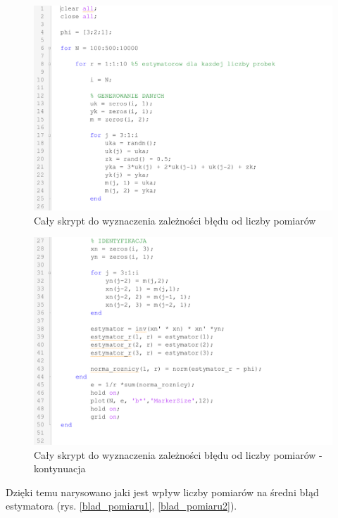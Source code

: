\documentclass[12pt]{article}
\begin{document}
\begin{figure}[H]
    \centering
    \includegraphics[width = \textwidth]{caly_skrypt1.png}
    \caption{Cały skrypt do wyznaczenia zależności błędu od liczby pomiarów}
    \label{caly_skrypt1}
\end{figure}

\begin{figure}[H]
    \centering
    \includegraphics[width = \textwidth]{caly_skrypt2.png}
    \caption{Cały skrypt do wyznaczenia zależności błędu od liczby pomiarów - kontynuacja}
    \label{caly_skrypt2}
\end{figure}



Dzięki temu narysowano jaki jest wpływ liczby pomiarów na średni błąd estymatora (rys. \ref{blad_pomiaru1}, \ref{blad_pomiaru2}).
\end{document}
